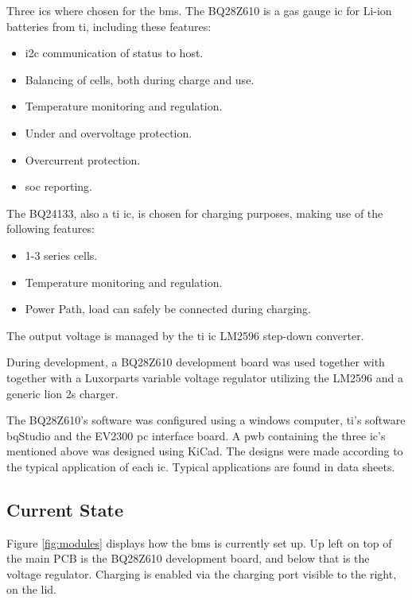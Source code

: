 Three \gls{ic}s where chosen for the \gls{bms}. The BQ28Z610 is a gas gauge \gls{ic} for Li-ion batteries from \gls{ti}, including these features:

\begin{itemize}[noitemsep]
	\item \gls{i2c} communication of status to host.
	\item Balancing of cells, both during charge and use.
	\item Temperature monitoring and regulation.
	\item Under and overvoltage protection.
	\item Overcurrent protection.
	\item \gls{soc} reporting.
\end{itemize}

The BQ24133, also a \gls{ti} \gls{ic}, is chosen for charging purposes, making use of the following features:

\begin{itemize}[noitemsep]
	\item 1-3 series cells.
	\item Temperature monitoring and regulation.
	\item Power Path, load can safely be connected during charging.
\end{itemize}

The output voltage is managed by the \gls{ti} \gls{ic} LM2596 step-down converter.

During development, a BQ28Z610 development board was used together with together with a Luxorparts variable voltage regulator utilizing the LM2596 and a generic \gls{lion} \gls{2s} charger.

The BQ28Z610’s software was configured using a windows computer, \gls{ti}’s software bqStudio and the EV2300 \gls{pc} interface board.
A \gls{pwb} containing the three \gls{ic}’s mentioned above was designed using KiCad. The designs were made according to the typical application of each \gls{ic}. Typical applications are found in data sheets.  

\subsection{Current State}
Figure \autoref{fig:modules} displays how the \gls{bms} is currently set up. Up left on top of the main PCB is the BQ28Z610 development board, and below that is the voltage regulator. Charging is enabled via the charging port visible to the right, on the lid.

